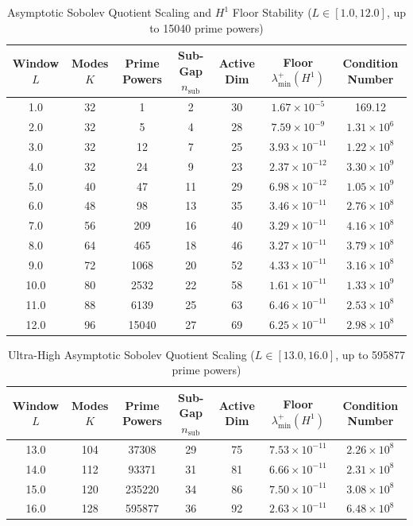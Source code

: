 \documentclass[11pt,a4paper]{article}
\begin{document}
\begin{table}[htbp]
\centering
\caption{Asymptotic Sobolev Quotient Scaling and $H^1$ Floor Stability ($L \in [1.0, 12.0]$, up to 15040 prime powers)}
\begin{tabular}{ccccccc}
\toprule
Window $L$ & Modes $K$ & Prime Powers & Sub-Gap $n_{\mathrm{sub}}$ & Active Dim & Floor $\lambda_{\min}^+(H^1)$ & Condition Number \\
\midrule
1.0 & 32 & 1 & 2 & 30 & $1.67\times 10^{-5}$ & 169.12 \\
2.0 & 32 & 5 & 4 & 28 & $7.59\times 10^{-9}$ & $1.31\times 10^{6}$ \\
3.0 & 32 & 12 & 7 & 25 & $3.93\times 10^{-11}$ & $1.22\times 10^{8}$ \\
4.0 & 32 & 24 & 9 & 23 & $2.37\times 10^{-12}$ & $3.30\times 10^{9}$ \\
5.0 & 40 & 47 & 11 & 29 & $6.98\times 10^{-12}$ & $1.05\times 10^{9}$ \\
6.0 & 48 & 98 & 13 & 35 & $3.46\times 10^{-11}$ & $2.76\times 10^{8}$ \\
7.0 & 56 & 209 & 16 & 40 & $3.29\times 10^{-11}$ & $4.16\times 10^{8}$ \\
8.0 & 64 & 465 & 18 & 46 & $3.27\times 10^{-11}$ & $3.79\times 10^{8}$ \\
9.0 & 72 & 1068 & 20 & 52 & $4.33\times 10^{-11}$ & $3.16\times 10^{8}$ \\
10.0 & 80 & 2532 & 22 & 58 & $1.61\times 10^{-11}$ & $1.33\times 10^{9}$ \\
11.0 & 88 & 6139 & 25 & 63 & $6.46\times 10^{-11}$ & $2.53\times 10^{8}$ \\
12.0 & 96 & 15040 & 27 & 69 & $6.25\times 10^{-11}$ & $2.98\times 10^{8}$ \\
\bottomrule
\end{tabular}
\end{table}

\begin{table}[htbp]
\centering
\caption{Ultra-High Asymptotic Sobolev Quotient Scaling ($L \in [13.0, 16.0]$, up to 595877 prime powers)}
\begin{tabular}{ccccccc}
\toprule
Window $L$ & Modes $K$ & Prime Powers & Sub-Gap $n_{\mathrm{sub}}$ & Active Dim & Floor $\lambda_{\min}^+(H^1)$ & Condition Number \\
\midrule
13.0 & 104 & 37308 & 29 & 75 & $7.53\times 10^{-11}$ & $2.26\times 10^{8}$ \\
14.0 & 112 & 93371 & 31 & 81 & $6.66\times 10^{-11}$ & $2.31\times 10^{8}$ \\
15.0 & 120 & 235220 & 34 & 86 & $7.50\times 10^{-11}$ & $3.08\times 10^{8}$ \\
16.0 & 128 & 595877 & 36 & 92 & $2.63\times 10^{-11}$ & $6.48\times 10^{8}$ \\
\bottomrule
\end{tabular}
\end{table}
\end{document}
